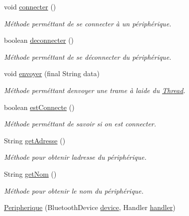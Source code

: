 \begin{DoxyCompactItemize}
\item 
void \hyperlink{classcom_1_1lasalle_1_1io__trucks_1_1_peripherique_ab2c35019f3ba71ec1b3b59470dc383ae}{connecter} ()
\begin{DoxyCompactList}\small\item\em Méthode perméttant de se connecter à un périphérique. \end{DoxyCompactList}\item 
boolean \hyperlink{classcom_1_1lasalle_1_1io__trucks_1_1_peripherique_afe5345d0dc31b1af1b311278241e228d}{deconnecter} ()
\begin{DoxyCompactList}\small\item\em Méthode perméttant de se déconnecter du périphérique. \end{DoxyCompactList}\item 
void \hyperlink{classcom_1_1lasalle_1_1io__trucks_1_1_peripherique_a7f691381f5164b92f8ff3f06561db656}{envoyer} (final String data)
\begin{DoxyCompactList}\small\item\em Méthode perméttant d\textquotesingle{}envoyer une trame à l\textquotesingle{}aide du \hyperlink{class_thread}{Thread}. \end{DoxyCompactList}\item 
boolean \hyperlink{classcom_1_1lasalle_1_1io__trucks_1_1_peripherique_a53878a13cdb7b3d8fa8e7c97cb0287f0}{est\+Connecte} ()
\begin{DoxyCompactList}\small\item\em Méthode perméttant de savoir si on est connecter. \end{DoxyCompactList}\item 
String \hyperlink{classcom_1_1lasalle_1_1io__trucks_1_1_peripherique_a4c8533394dd5322a31b7d09d17bfc796}{get\+Adresse} ()
\begin{DoxyCompactList}\small\item\em Méthode pour obtenir l\textquotesingle{}adresse du périphérique. \end{DoxyCompactList}\item 
String \hyperlink{classcom_1_1lasalle_1_1io__trucks_1_1_peripherique_abb25c792075ebe58d52419c84004c258}{get\+Nom} ()
\begin{DoxyCompactList}\small\item\em Méthode pour obtenir le nom du périphérique. \end{DoxyCompactList}\item 
\hyperlink{classcom_1_1lasalle_1_1io__trucks_1_1_peripherique_a89c00428bc04098ada95e4c5d4b4a168}{Peripherique} (Bluetooth\+Device \hyperlink{classcom_1_1lasalle_1_1io__trucks_1_1_peripherique_aa42a263edf31850160d722219115a0ea}{device}, Handler \hyperlink{classcom_1_1lasalle_1_1io__trucks_1_1_peripherique_afc44cb5a50cb29c450ef962efc735532}{handler})

\end{DoxyCompactItemize}
